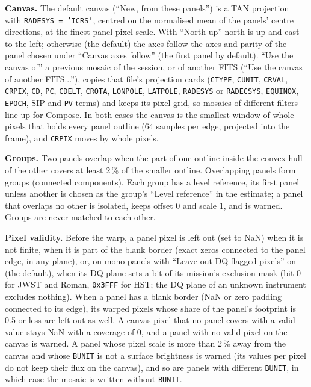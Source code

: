 \documentclass[11pt,a4paper]{article}
\newcommand{\code}[1]{\texttt{\small #1}}
\begin{document}
    \textbf{Canvas.} The default canvas (``New, from these panels'') is a TAN projection with \code{RADESYS = 'ICRS'}, centred on the normalised mean of the panels' centre directions, at the finest panel pixel scale. With ``North up'' north is up and east to the left; otherwise (the default) the axes follow the axes and parity of the panel chosen under ``Canvas axes follow'' (the first panel by default). ``Use the canvas of'' a previous mosaic of the session, or of another FITS (``Use the canvas of another FITS...''), copies that file's projection cards (\code{CTYPE}, \code{CUNIT}, \code{CRVAL}, \code{CRPIX}, \code{CD}, \code{PC}, \code{CDELT}, \code{CROTA}, \code{LONPOLE}, \code{LATPOLE}, \code{RADESYS} or \code{RADECSYS}, \code{EQUINOX}, \code{EPOCH}, SIP and \code{PV} terms) and keeps its pixel grid, so mosaics of different filters line up for Compose. In both cases the canvas is the smallest window of whole pixels that holds every panel outline (64 samples per edge, projected into the frame), and \code{CRPIX} moves by whole pixels.

    \textbf{Groups.} Two panels overlap when the part of one outline inside the convex hull of the other covers at least 2\,\% of the smaller outline. Overlapping panels form groups (connected components). Each group has a level reference, its first panel unless another is chosen as the group's ``Level reference'' in the estimate; a panel that overlaps no other is isolated, keeps offset 0 and scale 1, and is warned. Groups are never matched to each other.

    \textbf{Pixel validity.} Before the warp, a panel pixel is left out (set to NaN) when it is not finite, when it is part of the blank border (exact zeros connected to the panel edge, in any plane), or, on mono panels with ``Leave out DQ-flagged pixels'' on (the default), when its DQ plane sets a bit of its mission's exclusion mask (bit 0 for JWST and Roman, \code{0x3FFF} for HST; the DQ plane of an unknown instrument excludes nothing). When a panel has a blank border (NaN or zero padding connected to its edge), its warped pixels whose share of the panel's footprint is 0.5 or less are left out as well. A canvas pixel that no panel covers with a valid value stays NaN with a coverage of 0, and a panel with no valid pixel on the canvas is warned. A panel whose pixel scale is more than 2\,\% away from the canvas and whose \code{BUNIT} is not a surface brightness is warned (its values per pixel do not keep their flux on the canvas), and so are panels with different \code{BUNIT}, in which case the mosaic is written without \code{BUNIT}.
\end{document}
